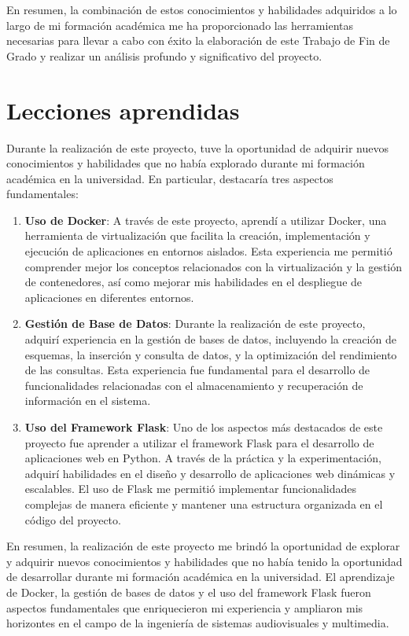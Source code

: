 \documentclass[a4paper, 12pt]{book}
\begin{document}
En resumen, la combinación de estos conocimientos y habilidades adquiridos a lo largo de mi formación académica me ha proporcionado las herramientas necesarias para llevar a cabo con éxito la elaboración de este Trabajo de Fin de Grado y realizar un análisis profundo y significativo del proyecto.


\section{Lecciones aprendidas}
\label{sec:lecciones_aprendidas}

Durante la realización de este proyecto, tuve la oportunidad de adquirir nuevos conocimientos y habilidades que no había explorado durante mi formación académica 
en la universidad. En particular, destacaría tres aspectos fundamentales:

\begin{enumerate}
  \item \textbf{Uso de Docker}: A través de este proyecto, aprendí a utilizar Docker, una herramienta de virtualización que facilita la creación, implementación y ejecución de aplicaciones en entornos aislados. Esta experiencia me permitió comprender mejor los conceptos relacionados con la virtualización y la gestión de contenedores, así como mejorar mis habilidades en el despliegue de aplicaciones en diferentes entornos.
  \item \textbf{Gestión de Base de Datos}: Durante la realización de este proyecto, adquirí experiencia en la gestión de bases de datos, incluyendo la creación de esquemas, la inserción y consulta de datos, y la optimización del rendimiento de las consultas. Esta experiencia fue fundamental para el desarrollo de funcionalidades relacionadas con el almacenamiento y recuperación de información en el sistema.
  \item \textbf{Uso del Framework Flask}: Uno de los aspectos más destacados de este proyecto fue aprender a utilizar el framework Flask para el desarrollo de aplicaciones web en Python. A través de la práctica y la experimentación, adquirí habilidades en el diseño y desarrollo de aplicaciones web dinámicas y escalables. El uso de Flask me permitió implementar funcionalidades complejas de manera eficiente y mantener una estructura organizada en el código del proyecto.
\end{enumerate}

En resumen, la realización de este proyecto me brindó la oportunidad de explorar y adquirir nuevos conocimientos y habilidades que 
no había tenido la oportunidad de desarrollar durante mi formación académica en la universidad. El aprendizaje de Docker, la gestión 
de bases de datos y el uso del framework Flask fueron aspectos fundamentales que enriquecieron mi experiencia y ampliaron mis horizontes en el campo de la ingeniería de sistemas audiovisuales y multimedia.
\end{document}
